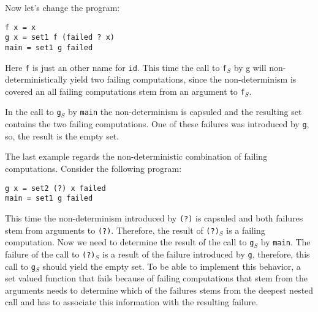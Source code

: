 \documentclass{article}
\begin{document}
Now let's change the program:

\begin{lstlisting}
f x = x
g x = set1 f (failed ? x)
main = set1 g failed
\end{lstlisting} 

Here \lstinline{f} is just an other name for \lstinline{id}. This time the
call to \lstinline{f}$_S$ by g will non-deterministically yield two
failing computations, since the non-determinism is covered an all
failing computations stem from an argument to \lstinline{f}$_S$.

In the call to \lstinline{g}$_S$ by \lstinline{main} the non-determinism is
capsuled and the resulting set contains the two failing computations. One of
these failures was introduced by \lstinline{g}, so, the result is the
empty set.

The last example regards the non-deterministic combination of failing
computations. Consider the following program:

\begin{lstlisting}
g x = set2 (?) x failed
main = set1 g failed
\end{lstlisting}

This time the non-determinism introduced by \lstinline{(?)} is capsuled and
both failures stem from arguments to \lstinline{(?)}. Therefore, the
result of \lstinline{(?)}$_S$ is a failing computation. Now we need to
determine the result of the call to \lstinline{g}$_S$ by \lstinline{main}.
The failure of the call to \lstinline{(?)}$_S$ is a result of the failure
introduced by \lstinline{g}, therefore, this call to \lstinline{g}$_S$
should yield the empty set. To be able to implement this behavior, a set
valued function that fails because of failing computations that stem
from the arguments needs to determine which of the failures stems from the
deepest nested call and has to associate this information with the resulting
failure.
\end{document}
